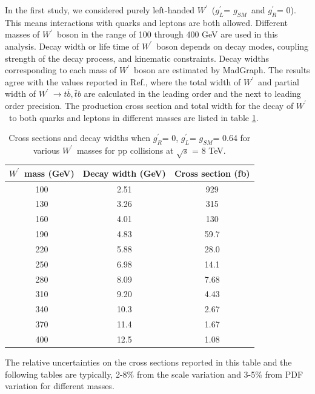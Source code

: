 \documentclass[preprint,showpacs,preprintnumbers]{revtex4}
\newcommand{\wprime}{\ensuremath{W^\prime}~}
\newcommand{\gR}{\ensuremath{g^\prime_R}}
\newcommand{\gL}{\ensuremath{g^\prime_L}}
\newcommand{\gSM}{\ensuremath{g_{\scriptscriptstyle SM}}}
\begin{document}
In the first study, we considered purely left-handed  \wprime (\gL = \gSM ~and \gR  = 0). 
This means interactions with quarks and leptons are both allowed. Different masses of  \wprime boson in the range of 100 through 400 GeV are used in this analysis.  
Decay width or life time of \wprime boson depends on decay modes, coupling strength of the decay process, and kinematic constraints. Decay widths corresponding to each mass of \wprime boson are estimated  by MadGraph. The results agree with the values reported in Ref.\cite{Sullivan:2002jt}, where the total width of \wprime and partial width of $\wprime \rightarrow t \bar{b},\bar{t}b $ are calculated in the leading order and the next to leading order precision.
The production cross section and total width for the decay of \wprime  to both quarks and leptons in different masses are listed in table \ref{tab:Xsec,L-h}. 
\begin{table}[htb]
	\centering
	\caption{Cross sections and decay widths when \gR = 0, \gL = \gSM = 0.64  for various \wprime masses for pp collisions at $\sqrt{s}$ = 8 TeV. \label{tab:Xsec,L-h} }
	\begin{tabular}{|c|c|c|}
		\hline 
		\wprime mass (GeV)  &  Decay width (GeV)  &  Cross section (fb)\\
		\hline 
		100 & 2.51 & 929 \\
		130 & 3.26 & 315 \\
		160 & 4.01 & 130 \\
		190 & 4.83 & 59.7 \\
		220 & 5.88 & 28.0 \\
		250 & 6.98 & 14.1 \\
		280 & 8.09 & 7.68 \\
		310 & 9.20 & 4.43 \\
		340 & 10.3 & 2.67 \\
		370 & 11.4 & 1.67 \\ 
		400 & 12.5 & 1.08 \\
		\hline
	\end{tabular}
\end{table}
The relative uncertainties on the cross sections reported in this table and the following tables are typically, 2-8\% from the scale variation and 3-5\% from PDF variation for different masses.
\end{document}
